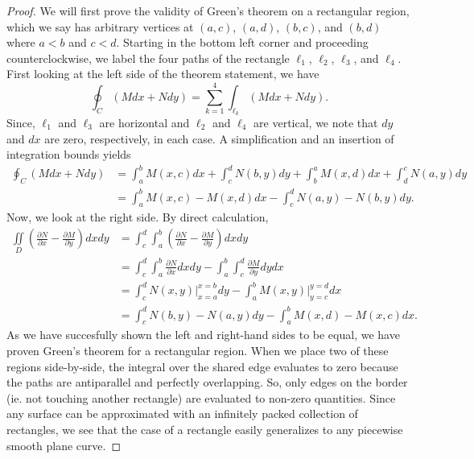 \begin{proof}
    We will first prove the validity of Green's theorem on a rectangular region, which we say has arbitrary vertices at $(a, c)$, $(a, d)$, $(b, c)$, and $(b, d)$ where $a < b$ and $c < d$. Starting in the bottom left corner and proceeding counterclockwise, we label the four paths of the rectangle $\ell_{1}$, $\ell_{2}$, $\ell_{3}$, and $\ell_{4}$. First looking at the left side of the theorem statement, we have
    \[\oint_{C}(Mdx + Ndy) = \sum_{k = 1}^{4}\int_{\ell_{k}}(Mdx + Ndy).\]
    Since, $\ell_{1}$ and $\ell_{3}$ are horizontal and $\ell_{2}$ and $\ell_{4}$ are vertical, we note that $dy$ and $dx$ are zero, respectively, in each case. A simplification and an insertion of integration bounds yields
    \begin{align*}
        \oint_{C}(Mdx + Ndy) &= \int_{a}^{b}M(x, c)dx + \int_{c}^{d}N(b, y)dy + \int_{b}^{a}M(x, d)dx + \int_{d}^{c}N(a, y)dy \\
        &= \int_{a}^{b}M(x, c) - M(x, d)dx - \int_{c}^{d}N(a, y) - N(b, y)dy.
    \end{align*}
    Now, we look at the right side. By direct calculation,
    \begin{align*}
        \iint\limits_{D}\left(\frac{\partial N}{\partial x} - \frac{\partial M}{\partial y}\right)dxdy &= \int_{c}^{d}\int_{a}^{b}\left(\frac{\partial N}{\partial x} - \frac{\partial M}{\partial y}\right)dxdy \\
        &= \int_{c}^{d}\int_{a}^{b}\frac{\partial N}{\partial x}dxdy - \int_{a}^{b}\int_{c}^{d}\frac{\partial M}{\partial y}dydx \\
        &= \int_{c}^{d} N(x, y) \biggr\rvert_{x = a}^{x = b} dy - \int_{a}^{b} M(x, y) \biggr\rvert_{y = c}^{y = d} dx \\
        &= \int_{c}^{d} N(b, y) - N(a, y) dy - \int_{a}^{b} M(x, d) - M(x, c) dx.
    \end{align*}
    As we have succesfully shown the left and right-hand sides to be equal, we have proven Green's theorem for a rectangular region. When we place two of these regions side-by-side, the integral over the shared edge evaluates to zero because the paths are antiparallel and perfectly overlapping.
    So, only edges on the border (ie. not touching another rectangle) are evaluated to non-zero quantities. Since any surface can be approximated with an infinitely packed collection of rectangles, we see that the case of a rectangle easily generalizes to any piecewise smooth plane curve.
\end{proof}